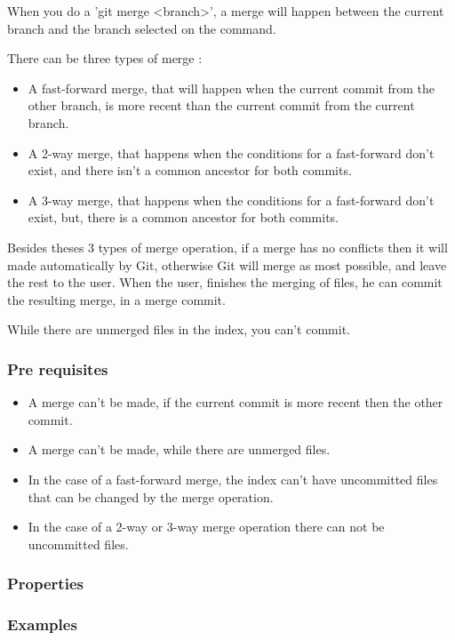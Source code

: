 When you do a 'git merge <branch>', a merge will happen between the current
branch and the branch selected on the command. \par
There can be three types of merge : 
\begin{itemize}
\item A fast-forward merge, that will happen when 
the current commit from the other
branch, is more recent than the current commit from the current branch.
\item A 2-way merge, that happens when the conditions for a fast-forward
don't exist, and there isn't a common ancestor for both commits.
\item A 3-way merge, that happens when the conditions for a fast-forward
don't exist, but, there is a common ancestor for both commits.
\end{itemize}
Besides theses 3 types of merge operation, if a merge has no conflicts then
it will made automatically by Git, otherwise Git will merge as most possible,
and leave the rest to the user. When the user, finishes the merging of files, he
can commit the resulting merge, in a merge commit. \par
While there are unmerged files in the index, you can't commit.

\subsubsection{Pre requisites}

\begin{itemize}
\item A merge can't be made, if the current commit is more recent then the
other commit.
\item A merge can't be made, while there are unmerged files.
\item In the case of a fast-forward merge, the index can't have uncommitted
files that can be changed by the merge operation.
\item In the case of a 2-way or 3-way merge operation there can not be
uncommitted files. 
\end{itemize}

\subsubsection{Properties}

\subsubsection{Examples}
